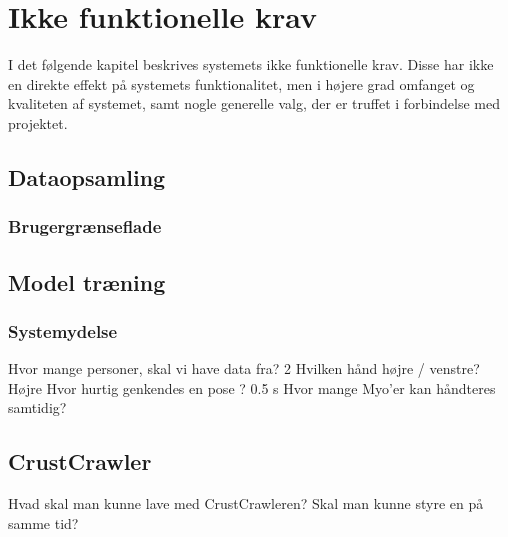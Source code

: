 \thispagestyle{fancy}
\chapter{Ikke funktionelle krav}
I det følgende kapitel beskrives systemets ikke funktionelle krav. Disse har ikke en direkte effekt på systemets funktionalitet, men i højere grad omfanget og kvaliteten af systemet, samt nogle generelle valg, der er truffet i forbindelse med projektet.

\section{Dataopsamling}
\subsection{Brugergrænseflade}

\section{Model træning}
\subsection{Systemydelse}
Hvor mange personer, skal vi have data fra? 2
Hvilken hånd højre / venstre? Højre
Hvor hurtig genkendes en pose ? 0.5 s
Hvor mange Myo'er kan håndteres samtidig?
%

\section{CrustCrawler}

Hvad skal man kunne lave med CrustCrawleren?
Skal man kunne styre en på samme tid?